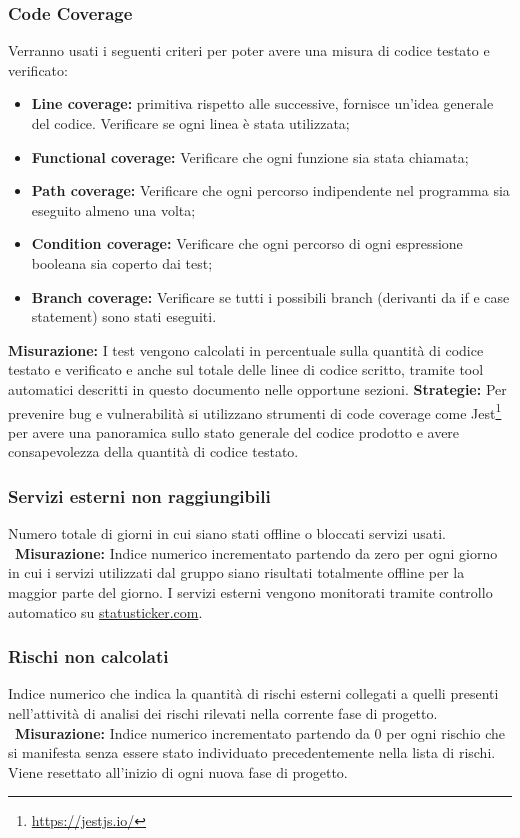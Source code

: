 	 	\subsubsection{Code Coverage} Verranno usati i seguenti criteri per poter avere una misura di codice testato e verificato:\newline
	 		\begin{itemize}
	 			\item \textbf{Line coverage:} primitiva rispetto alle successive, fornisce un’idea generale del codice. Verificare se ogni linea è stata utilizzata;
	 			\item \textbf{Functional coverage:} Verificare che ogni funzione sia stata chiamata;
	 			\item \textbf{Path coverage:} Verificare che ogni percorso indipendente nel programma sia eseguito almeno una volta;
	 			\item \textbf{Condition coverage:} Verificare che ogni percorso di ogni espressione booleana sia coperto dai test;
	 			\item \textbf{Branch coverage:} Verificare se tutti i possibili branch (derivanti da if e case statement) sono stati eseguiti.
	 		\end{itemize}
	 \textbf{Misurazione:} I test vengono calcolati in percentuale sulla quantità di codice testato e verificato e anche sul totale delle linee di codice scritto, tramite tool automatici descritti in questo documento nelle opportune sezioni.\newline \newline
	 \textbf{Strategie:} Per prevenire bug e vulnerabilità si utilizzano strumenti di code coverage come Jest\footnote{\url{https://jestjs.io/}} per avere una panoramica sullo stato generale del codice prodotto e avere consapevolezza della quantità di codice testato.
	 \subsubsection{Servizi esterni non raggiungibili} Numero totale di giorni in cui siano stati offline o bloccati servizi usati.\newline
		 ~\newline\textbf{Misurazione:} Indice numerico incrementato partendo da zero per ogni giorno
in cui i servizi utilizzati dal gruppo siano risultati totalmente offline per la maggior parte del giorno. I servizi esterni vengono monitorati tramite controllo automatico su \url{statusticker.com}.\newline
		\subsubsection{Rischi non calcolati} Indice numerico che indica la quantità di rischi esterni collegati a quelli presenti nell’attività di
analisi dei rischi rilevati nella corrente fase di progetto.
\newline
		~\newline\textbf{Misurazione:} Indice numerico incrementato partendo da 0 per ogni rischio che
si manifesta senza essere stato individuato precedentemente nella lista di rischi.
		Viene resettato all’inizio di ogni nuova fase di progetto.
		\newline
